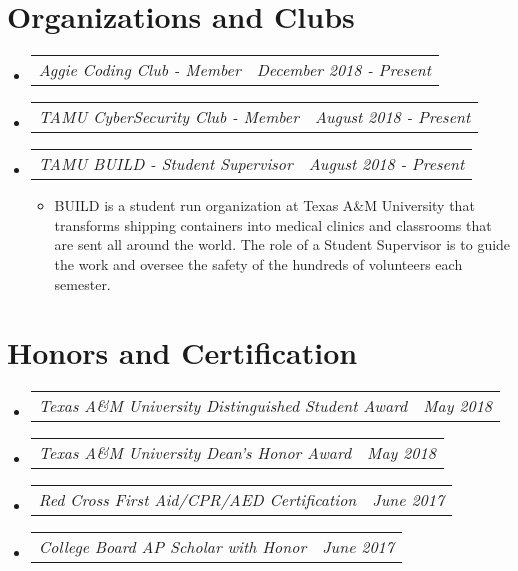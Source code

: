 \documentclass[letterpaper,11pt]{article}
\makeatletter
\newcommand{\resumeAward}[2]{
  \vspace{-1pt}
    \item\begin{tabular*}{0.97\textwidth}{l@{\extracolsep{\fill}}r}
    \textit{\small#1} & \textit{\small #2} \\
    \end{tabular*}\vspace{-20pt}
}
\newcommand{\resumeJobDesc}[1]{
  \item\small{{ #1 \vspace{-2pt}}
  }
}
\newcommand{\resumeSubHeadingListStart}{\begin{itemize}[leftmargin=*]}
\newcommand{\resumeSubHeadingListEnd}{\end{itemize}}
\newcommand{\resumeItemListStart}{\begin{itemize}}
\newcommand{\resumeItemListEnd}{\end{itemize}\vspace{-5pt}}
\makeatother
\begin{document}
\section{Organizations and Clubs}
\resumeSubHeadingListStart
        \resumeAward{Aggie Coding Club - Member}{December 2018 - Present}
        \resumeAward{TAMU CyberSecurity Club - Member}{August 2018 - Present}
        \resumeAward{TAMU BUILD - Student Supervisor}{August 2018 - Present}
        \vspace{3pt}
        \resumeItemListStart
                \resumeJobDesc{BUILD is a student run organization at Texas A\&M University that transforms shipping containers into medical clinics and classrooms that are sent all around the world. The role of a Student Supervisor is to guide the work and oversee the safety of the hundreds of volunteers each semester.}
        \resumeItemListEnd
\resumeSubHeadingListEnd

\section{Honors and Certification}
  \resumeSubHeadingListStart
    \resumeAward{Texas A\&M University Distinguished Student Award}{May 2018}
    \resumeAward{Texas A\&M University Dean's Honor Award}{May 2018}
    \resumeAward{Red Cross First Aid/CPR/AED Certification}{June 2017}
    \resumeAward{College Board AP Scholar with Honor}{June 2017}
\resumeSubHeadingListEnd
\vspace{5pt}

\end{document}
